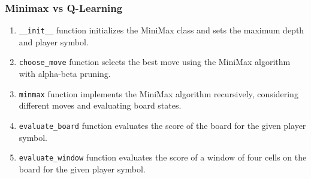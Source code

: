 \documentclass{article}
\begin{document}
\subsubsection{Minimax vs Q-Learning}
\begin{enumerate}
    \item \texttt{\_\_init\_\_} function initializes the MiniMax class and sets the maximum depth and player symbol.
    \item \texttt{choose\_move} function selects the best move using the MiniMax algorithm with alpha-beta pruning.
    \item \texttt{minmax} function implements the MiniMax algorithm recursively, considering different moves and evaluating board states.
    \item \texttt{evaluate\_board} function evaluates the score of the board for the given player symbol.
    \item \texttt{evaluate\_window} function evaluates the score of a window of four cells on the board for the given player symbol.
\end{enumerate}
\end{document}
